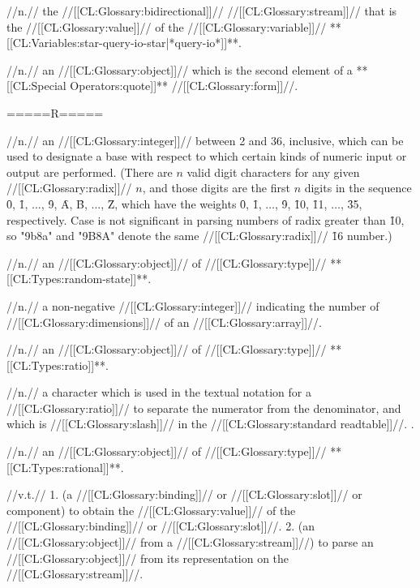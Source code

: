  //n.// the //[[CL:Glossary:bidirectional]]// //[[CL:Glossary:stream]]// that is the //[[CL:Glossary:value]]// of the //[[CL:Glossary:variable]]// **[[CL:Variables:star-query-io-star|*query-io*]]**.

 //n.// an //[[CL:Glossary:object]]// which is the second element of a **[[CL:Special Operators:quote]]** //[[CL:Glossary:form]]//.

=====R=====
 
 //n.// an //[[CL:Glossary:integer]]// between 2 and 36, inclusive, which can be used to designate a base with respect to which certain kinds of numeric input or output are performed. (There are $n$ valid digit characters for any given //[[CL:Glossary:radix]]// $n$, and those digits are the first $n$ digits in the sequence \f{0}, \f{1}, $\ldots$, \f{9}, \f{A}, \f{B}, $\ldots$, \f{Z}, which have the weights \f{0}, \f{1}, $\ldots$, \f{9}, \f{10}, \f{11}, $\ldots$, \f{35}, respectively. Case is not significant in parsing numbers of radix greater than \f{10}, so "9b8a" and "9B8A" denote the same //[[CL:Glossary:radix]]// \f{16} number.)

 //n.// an //[[CL:Glossary:object]]// of //[[CL:Glossary:type]]// **[[CL:Types:random-state]]**.

 //n.// a non-negative //[[CL:Glossary:integer]]// indicating the number of //[[CL:Glossary:dimensions]]// of an //[[CL:Glossary:array]]//.
 
 //n.// an //[[CL:Glossary:object]]// of //[[CL:Glossary:type]]// **[[CL:Types:ratio]]**.

 //n.// a character which is used in the textual notation for a //[[CL:Glossary:ratio]]// to separate the numerator from the denominator, and which is //[[CL:Glossary:slash]]// in the //[[CL:Glossary:standard readtable]]//. \Seesection\CharacterSyntax.

 //n.// an //[[CL:Glossary:object]]// of //[[CL:Glossary:type]]// **[[CL:Types:rational]]**.
 
 //v.t.// 
 1. (a //[[CL:Glossary:binding]]// or //[[CL:Glossary:slot]]// or component) to obtain the //[[CL:Glossary:value]]// of the //[[CL:Glossary:binding]]// or //[[CL:Glossary:slot]]//. 2. (an //[[CL:Glossary:object]]// from a //[[CL:Glossary:stream]]//) to parse an //[[CL:Glossary:object]]// from its representation on the //[[CL:Glossary:stream]]//.



